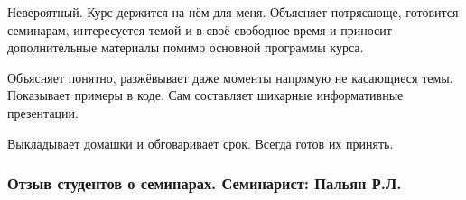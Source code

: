             \begin{commentbox} 
                Невероятный. Курс держится на нём для меня. Объясняет потрясающе, готовится  семинарам, интересуется темой и в своё свободное время и приносит дополнительные материалы помимо основной программы курса.
        
                Объясняет понятно, разжёвывает даже моменты напрямую не касающиеся темы. Показывает примеры в коде. Сам составляет шикарные информативные презентации. 
        
                Выкладывает домашки и обговаривает срок. Всегда готов их принять.  
            \end{commentbox} 


    \subsubsection{Отзыв студентов о семинарах. Семинарист: Пальян Р.Л.}

